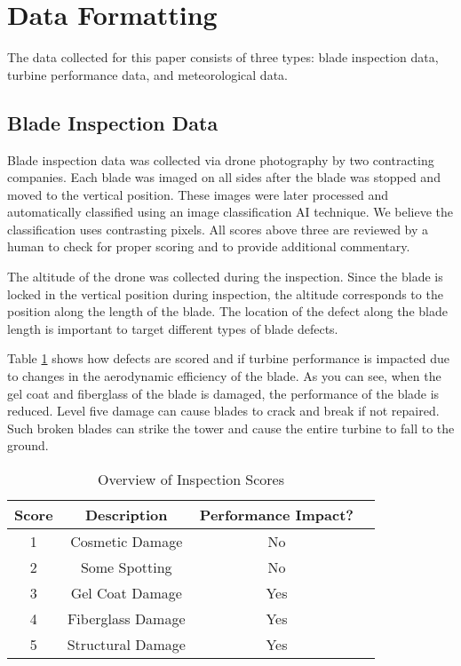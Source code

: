 \documentclass[runningheads]{llncs}
\begin{document}
\section{Data Formatting}
The data collected for this paper consists of three types: blade inspection data, turbine performance data, and meteorological data. 

\subsection{Blade Inspection Data}
Blade inspection data was collected via drone photography by two contracting companies. Each blade was imaged on all sides after the blade was stopped and moved to the vertical position. These images were later processed and automatically classified using an image classification AI technique. We believe the classification uses contrasting pixels. All scores above three are reviewed by a human to check for proper scoring and to provide additional  commentary. 

The altitude of the drone was collected during the inspection. Since the blade is locked in the vertical position during inspection, the altitude corresponds to the position along the length of the blade. The location of the defect along the blade length is important to target different types of blade defects. 

Table \ref{table:1} shows how defects are scored and if turbine performance is impacted due to changes in the aerodynamic efficiency of the blade. As you can see, when the gel coat and fiberglass of the blade is damaged, the performance of the blade is reduced. Level five damage can cause blades to crack and break if not repaired. Such broken blades can strike the tower and cause the entire turbine to fall to the ground.    

\begin{table}[H]
    \centering
    \begin{tabular}{|c|c|c|c|} 
     \hline
     Score & Description & Performance Impact? \\ [0.5ex] 
     \hline
     1 & Cosmetic Damage & No \\ 
     2 & Some Spotting & No \\
     3 & Gel Coat Damage & Yes \\
     4 & Fiberglass Damage & Yes \\
     5 & Structural Damage & Yes \\ [1ex] 
     \hline
    \end{tabular}
    \caption{Overview of Inspection Scores}
    \label{table:1}
\end{table}
\end{document}
